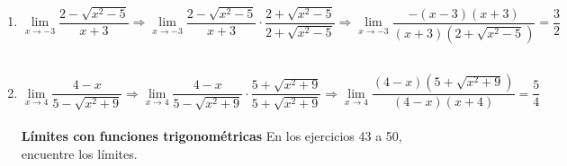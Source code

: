 \begin{enumerate}
\item $\lim\limits_{x\to -3}\dfrac{2-\sqrt{x^2-5}}{x+3} \Longrightarrow \lim\limits_{x\to -3}\dfrac{2-\sqrt{x^2-5}}{x+3}\cdot \dfrac{2+\sqrt{x^2-5}}{2+\sqrt{x^2-5}} \Longrightarrow \lim\limits_{x\to -3}\dfrac{-(x-3)(x+3)}{(x+3)(2+\sqrt{x^2-5})} = \dfrac{3}{2}$\\\\

\item $\lim\limits_{x\to 4} \dfrac{4-x}{5-\sqrt{x^2+9}} \Longrightarrow \lim\limits_{x\to 4} \dfrac{4-x}{5-\sqrt{x^2+9}}\cdot \dfrac{5+\sqrt{x^2+9}}{5+\sqrt{x^2+9}} \Longrightarrow \lim\limits_{x\to 4}\dfrac{(4-x)(5+\sqrt{x^2+9})}{(4-x)(x+4)} = \dfrac{5}{4}$\\\\

\textbf{Límites con funciones trigonométricas} En los ejercicios 43 a 50, encuentre los límites.\\\\

\end{enumerate}
